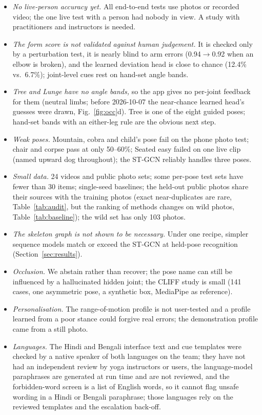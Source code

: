 \begin{itemize}
\item \emph{No live-person accuracy yet.} All end-to-end tests use photos or recorded video; the one live test with a person had nobody in view. A study with practitioners and instructors is needed.
\item \emph{The form score is not validated against human judgement.} It is checked only by a perturbation test, it is nearly blind to arm errors (0.94$\to$0.92 when an elbow is broken), and the learned deviation head is close to chance (12.4\% vs.\ 6.7\%); joint-level cues rest on hand-set angle bands.
\item \emph{Tree and Lunge have no angle bands,} so the app gives no per-joint feedback for them (neutral limbs; before 2026-10-07 the near-chance learned head's guesses were drawn, Fig.~\ref{fig:occ}d). Tree is one of the eight guided poses; hand-set bands with an either-leg rule are the obvious next step.
\item \emph{Weak poses.} Mountain, cobra and child's pose fail on the phone photo test; chair and corpse pass at only 50--60\%; Seated easy failed on one live clip (named upward dog throughout); the ST-GCN reliably handles three poses.
\item \emph{Small data.} 24 videos and public photo sets; some per-pose test sets have fewer than 30 items; single-seed baselines; the held-out public photos share their sources with the training photos (exact near-duplicates are rare, Table~\ref{tab:audit}, but the ranking of methods changes on wild photos, Table~\ref{tab:baseline}); the wild set has only 103 photos.
\item \emph{The skeleton graph is not shown to be necessary.} Under one recipe, simpler sequence models match or exceed the ST-GCN at held-pose recognition (Section~\ref{sec:results}).
\item \emph{Occlusion.} We abstain rather than recover; the pose name can still be influenced by a hallucinated hidden joint; the CLIFF study is small (141 cases, one asymmetric pose, a synthetic box, MediaPipe as reference).
\item \emph{Personalisation.} The range-of-motion profile is not user-tested and a profile learned from a poor stance could forgive real errors; the demonstration profile came from a still photo.
\item \emph{Languages.} The Hindi and Bengali interface text and cue templates were checked by a native speaker of both languages on the team; they have not had an independent review by yoga instructors or users, the language-model paraphrases are generated at run time and are not reviewed, and the forbidden-word screen is a list of English words, so it cannot flag unsafe wording in a Hindi or Bengali paraphrase; those languages rely on the reviewed templates and the escalation back-off.

\end{itemize}
